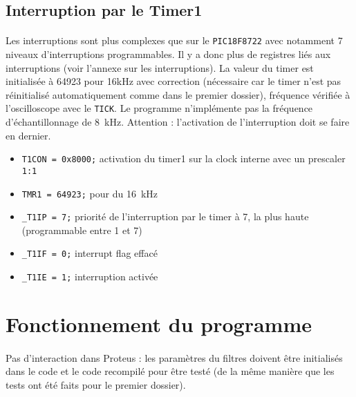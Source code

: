 \documentclass{article}
\begin{document}
        \subsection{Interruption par le Timer1}
        \paragraph{}
        Les interruptions sont plus complexes que sur le \texttt{PIC18F8722} avec notamment 7 niveaux d'interruptions programmables. Il y a donc plus de registres liés aux interruptions (voir l'annexe sur les interruptions). La valeur du timer est initialisée à 64923 pour 16kHz avec correction (nécessaire car le timer n'est pas réinitialisé automatiquement comme dans le premier dossier), fréquence vérifiée à l'oscilloscope avec le \texttt{TICK}. Le programme n'implémente pas la fréquence d'échantillonnage de \SI{8}{\kilo\hertz}. Attention : l'activation de l'interruption doit se faire en dernier.

        \begin{itemize}
            \item \texttt{T1CON = 0x8000;} activation du timer1 sur la clock interne avec un prescaler \texttt{1:1}
            \item \texttt{TMR1 = 64923;} pour du \SI{16}{\kilo\hertz}
            \item \texttt{\_T1IP = 7;} priorité de l'interruption par le timer à 7, la plus haute (programmable entre 1 et 7)
            \item \texttt{\_T1IF = 0;} interrupt flag effacé
            \item \texttt{\_T1IE = 1;} interruption activée
        \end{itemize}



    \section{Fonctionnement du programme}
    \paragraph{}
    Pas d'interaction dans Proteus : les paramètres du filtres doivent être initialisés dans le code et le code recompilé pour être testé (de la même manière que les tests ont été faits pour le premier dossier).
\end{document}
